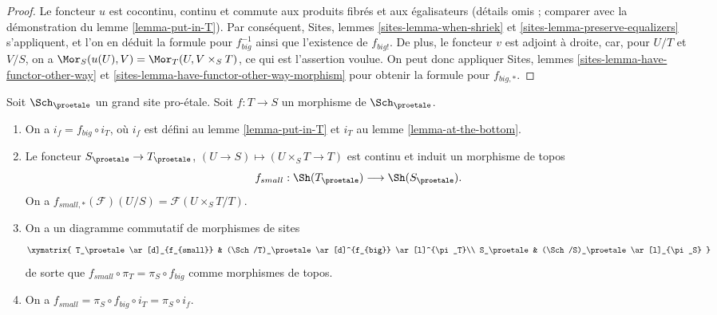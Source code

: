 \begin{proof}
Le foncteur $u$ est cocontinu, continu et commute aux produits fibrés
et aux égalisateurs (détails omis ; comparer avec la démonstration du
lemme \ref{lemma-put-in-T}). Par conséquent,
Sites, lemmes \ref{sites-lemma-when-shriek} et
\ref{sites-lemma-preserve-equalizers}
s'appliquent, et l'on en déduit la formule
pour $f_{big}^{-1}$ ainsi que l'existence de $f_{big!}$. De plus,
le foncteur $v$ est adjoint à droite, car, pour $U/T$ et $V/S$,
on a $\Mor_S(u(U), V) = \Mor_T(U, V \times_S T)$,
ce qui est l'assertion voulue. On peut donc appliquer
Sites, lemmes \ref{sites-lemma-have-functor-other-way} et
\ref{sites-lemma-have-functor-other-way-morphism}
pour obtenir la formule pour $f_{big, *}$.
\end{proof}

\begin{lemma}
\label{lemma-morphism-big-small}
Soit $\Sch_\proetale$ un grand site pro-\'etale.
Soit $f : T \to S$ un morphisme de $\Sch_\proetale$.
\begin{enumerate}
\item On a $i_f = f_{big} \circ i_T$, où $i_f$ est défini au
lemme \ref{lemma-put-in-T} et $i_T$ au
lemme \ref{lemma-at-the-bottom}.
\item Le foncteur $S_\proetale \to T_\proetale$,
$(U \to S) \mapsto (U \times_S T \to T)$ est continu et induit
un morphisme de topos
$$
f_{small} : \Sh(T_\proetale) \longrightarrow \Sh(S_\proetale).
$$
On a $f_{small, *}(\mathcal{F})(U/S) = \mathcal{F}(U \times_S T/T)$.
\item On a un diagramme commutatif de morphismes de sites
$$
\xymatrix{
T_\proetale \ar[d]_{f_{small}} &
(\Sch/T)_\proetale \ar[d]^{f_{big}} \ar[l]^{\pi_T}\\
S_\proetale &
(\Sch/S)_\proetale \ar[l]_{\pi_S}
}
$$
de sorte que $f_{small} \circ \pi_T = \pi_S \circ f_{big}$ comme morphismes de topos.
\item On a $f_{small} = \pi_S \circ f_{big} \circ i_T = \pi_S \circ i_f$.
\end{enumerate}
\end{lemma}

